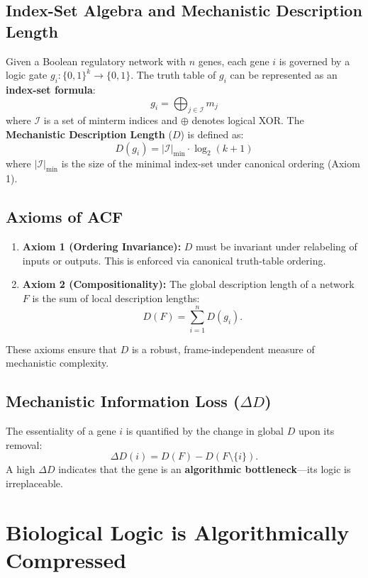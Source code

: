 \documentclass[10pt, twocolumn]{article}
\begin{document}
\subsection{Index-Set Algebra and Mechanistic Description Length}

Given a Boolean regulatory network with $n$ genes, each gene $i$ is governed by a logic gate $g_i: \{0,1\}^k \to \{0,1\}$. The truth table of $g_i$ can be represented as an \textbf{index-set formula}:
\[
g_i = \bigoplus_{j \in \mathcal{I}} m_j
\]
where $\mathcal{I}$ is a set of minterm indices and $\oplus$ denotes logical XOR. The \textbf{Mechanistic Description Length} ($D$) is defined as:
\[
D(g_i) = |\mathcal{I}|_{\text{min}} \cdot \log_2(k+1)
\]
where $|\mathcal{I}|_{\text{min}}$ is the size of the minimal index-set under canonical ordering (Axiom 1).

\subsection{Axioms of ACF}

\begin{enumerate}
    \item \textbf{Axiom 1 (Ordering Invariance):} $D$ must be invariant under relabeling of inputs or outputs. This is enforced via canonical truth-table ordering.
    \item \textbf{Axiom 2 (Compositionality):} The global description length of a network $F$ is the sum of local description lengths:
    \[
    D(F) = \sum_{i=1}^n D(g_i).
    \]
\end{enumerate}

These axioms ensure that $D$ is a robust, frame-independent measure of mechanistic complexity.

\subsection{Mechanistic Information Loss ($\Delta D$)}

The essentiality of a gene $i$ is quantified by the change in global $D$ upon its removal:
\[
\Delta D(i) = D(F) - D(F \setminus \{i\}).
\]
A high $\Delta D$ indicates that the gene is an \textbf{algorithmic bottleneck}—its logic is irreplaceable.

\section{Biological Logic is Algorithmically Compressed}
\end{document}
